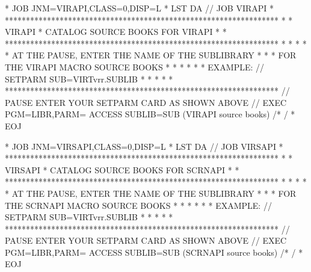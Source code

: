 \documentclass[letterpaper,10pt,english]{sphinxmanual}
\begin{document}
\begin{sphinxVerbatim}[commandchars=\\\{\}]
* \PYGZdl{}\PYGZdl{} JOB JNM=VIRAPI,CLASS=0,DISP=L
* \PYGZdl{}\PYGZdl{} LST DA
// JOB VIRAPI
* *****************************************************************
* * VIRAPI * CATALOG SOURCE BOOKS FOR VIRAPI                      *
* *****************************************************************
* *                                                               *
* * AT THE PAUSE, ENTER THE NAME OF THE SUB\PYGZhy{}LIBRARY               *
* * FOR THE VIRAPI MACRO SOURCE BOOKS                             *
* *                                                               *
* * EXAMPLE: // SETPARM SUB=\PYGZsq{}VIRTvrr.SUBLIB\PYGZsq{}                      *
* *                                                               *
* *****************************************************************
// PAUSE ENTER YOUR SETPARM CARD AS SHOWN ABOVE
// EXEC PGM=LIBR,PARM=\PYGZsq{} ACCESS SUBLIB=\PYGZam{}SUB\PYGZsq{}
        (VIRAPI source books)
/*
/\PYGZam{}
* \PYGZdl{}\PYGZdl{} EOJ
\end{sphinxVerbatim}


\begin{sphinxVerbatim}[commandchars=\\\{\}]
* \PYGZdl{}\PYGZdl{} JOB JNM=VIRSAPI,CLASS=0,DISP=L
* \PYGZdl{}\PYGZdl{} LST DA
// JOB VIRSAPI
* *****************************************************************
* * VIRSAPI * CATALOG SOURCE BOOKS FOR SCRNAPI                    *
* *****************************************************************
* *                                                               *
* * AT THE PAUSE, ENTER THE NAME OF THE SUB\PYGZhy{}LIBRARY               *
* * FOR THE SCRNAPI MACRO SOURCE BOOKS                            *
* *                                                               *
* * EXAMPLE: // SETPARM SUB=\PYGZsq{}VIRTvrr.SUBLIB\PYGZsq{}                      *
* *                                                               *
* *****************************************************************
// PAUSE ENTER YOUR SETPARM CARD AS SHOWN ABOVE
// EXEC PGM=LIBR,PARM=\PYGZsq{} ACCESS SUBLIB=\PYGZam{}SUB\PYGZsq{}
        (SCRNAPI source books)
/*
/\PYGZam{}
* \PYGZdl{}\PYGZdl{} EOJ
\end{sphinxVerbatim}

\end{document}
